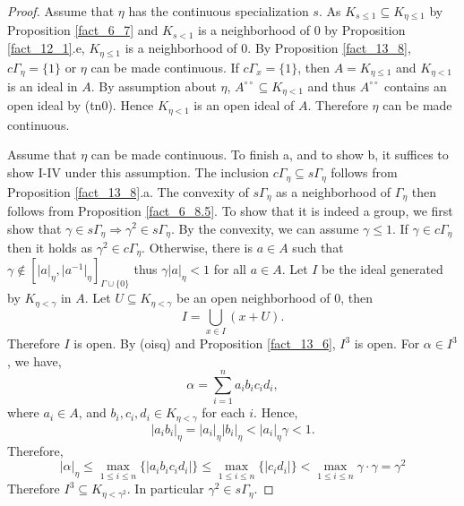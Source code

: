 \documentclass[8pt]{article}
\numberwithin{equation}{section}
\newcommand{\ab}[1]{\vert #1 \vert}
\newcommand{\cGamma}[0]{c\Gamma}
\newcommand{\dcirc}[0]{{\circ\circ}}
\begin{document}
\begin{proof}
    Assume that $\eta$ has the continuous specialization $s$. As $K_{s\leq 1}\subseteq K_{\eta\leq 1}$ by Proposition \ref{fact_6_7} and $K_{s<1}$ is a neighborhood of $0$ by Proposition \ref{fact_12_1}.e, $K_{\eta\leq1}$ is a neighborhood of $0$. By Proposition \ref{fact_13_8}, $\cGamma_\eta=\{1\}$ or $\eta$ can be made continuous.
    If $\cGamma_x=\{1\}$, then $A=K_{\eta\leq1}$ and $K_{\eta<1}$ is an ideal in $A$. By assumption about $\eta$, $A^\dcirc\subseteq K_{\eta<1}$ and thus $A^\dcirc$ contains an open ideal by (tn0). Hence $K_{\eta<1}$ is an open ideal of $A$. Therefore $\eta$ can be made continuous.
    \par Assume that $\eta$ can be made continuous. To finish a, and to show b, it suffices to show I-IV under this assumption. 
    The inclusion $\cGamma_\eta \subseteq s\Gamma_\eta$ follows from Proposition \ref{fact_13_8}.a. The convexity of $s\Gamma_\eta$ as a neighborhood of $\Gamma_\eta$ then follows from Proposition \ref{fact_6_8.5}. 
    To show that it is indeed a group, we first show that $\gamma\in s\Gamma_\eta\Rightarrow \gamma^2\in s\Gamma_\eta$. By the convexity, we can assume $\gamma\leq 1$. If $\gamma\in\cGamma_\eta$ then it holds as $\gamma^2\in\cGamma_\eta$. Otherwise, there is $a\in A$ such that $\gamma\not\in[\ab{a}_\eta,\ab{a^{-1}}_\eta]_{\Gamma\cup\{0\}}$ thus $\gamma\ab{a}_\eta<1$ for all $a\in A$.  
    Let $I$ be the ideal generated by $K_{\eta<\gamma}$ in $A$. Let $U\subseteq K_{\eta<\gamma}$ be an open neighborhood of $0$, then 
    \begin{equation*}
        I = \bigcup_{x\in I}(x+U).
    \end{equation*}
    Therefore $I$ is open. By (oisq) and Proposition \ref{fact_13_6}, $I^3$ is open. For $\alpha\in I^3$, we have,
    \begin{equation*}
        \alpha = \sum_{i=1}^n a_ib_ic_id_i,
    \end{equation*}
    where $a_i\in A$, and $b_i,c_i,d_i\in K_{\eta<\gamma}$ for each $i$. Hence,
    \begin{equation*}
        \ab{a_ib_i}_\eta=\ab{a_i}_\eta\ab{b_i}_\eta <\ab{a_i}_\eta\gamma<1.
    \end{equation*}
    Therefore, 
    \begin{equation*}
    \ab{\alpha}_\eta \leq \max_{1\leq i\leq n}\{\ab{a_ib_ic_id_i}\}\leq \max_{1\leq i\leq n}\{\ab{c_id_i}\} <\max_{1\leq i\leq n}\gamma\cdot\gamma=\gamma^2
    \end{equation*}
    Therefore $I^3\subseteq K_{\eta<\gamma^2}$. In particular $\gamma^2\in s\Gamma_\eta$.

\end{proof}
\end{document}
